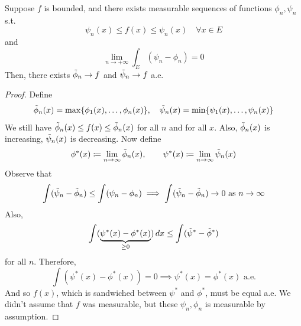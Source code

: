   \begin{lemma}
    \label{thm:squeezing-a-bounded-function-between-simple}
 
    Suppose $f$ is bounded, and there exists measurable sequences of functions $\phi_n, \psi_n$ s.t. 
    \begin{equation}
      \psi_n (x) \leq f(x) \leq \psi_n(x) \quad \forall x \in E
    \end{equation}
    and 
    \begin{equation}
      \lim_{n \to +\infty} \int_E (\psi_n - \phi_n) = 0
    \end{equation}
    Then, there exists $\Tilde{\phi}_n \to f$ and $\Tilde{\psi}_n \to f$ a.e. 
  \end{lemma}
  \begin{proof}
    Define 
    \begin{equation}
      \Tilde{\phi}_n (x) = \max\{\phi_1 (x) , \ldots, \phi_n (x) \}, \quad \Tilde{\psi}_n (x) = \min\{\psi_1 (x) , \ldots, \psi_n (x) \}
    \end{equation}
    We still have $\Tilde{\phi}_n (x) \leq f(x) \leq \Tilde{\phi}_n (x)$ for all $n$ and for all $x$. Also, $\Tilde{\phi}_n (x)$ is increasing, $\Tilde{\psi}_n (x)$ is decreasing. Now define 
    \begin{equation}
      \phi^\ast (x) \coloneqq \lim_{n \to \infty} \Tilde{\phi}_n (x), \qquad \psi^\ast (x) \coloneqq \lim_{n \to \infty} \Tilde{\psi}_n (x)
    \end{equation}
    Observe that 
    \begin{equation}
      \int (\Tilde{\psi}_n - \Tilde{\phi}_n) \leq \int (\psi_n - \phi_n) \implies \int (\Tilde{\psi}_n - \Tilde{\phi}_n) \to 0 \text{ as } n \to \infty 
    \end{equation}
    Also, 
    \begin{equation}
      \int (\underbrace{\psi^\ast (x) - \phi^\ast(x)}_{\geq 0}) \,dx \leq \int (\Tilde{\psi}^\ast - \Tilde{\phi}^\ast) 
    \end{equation}
    for all $n$. Therefore, 
    \begin{equation}
      \int (\psi^\ast (x) - \phi^\ast (x)) = 0 \implies \psi^\ast (x) = \phi^\ast (x) \text{ a.e.}
    \end{equation}
    And so $f(x)$, which is sandwiched between $\psi^\ast$ and $\phi^\ast$, must be equal a.e. We didn't assume that $f$ was measurable, but these $\psi_n, \phi_n$ is measurable by assumption. 
  \end{proof}

